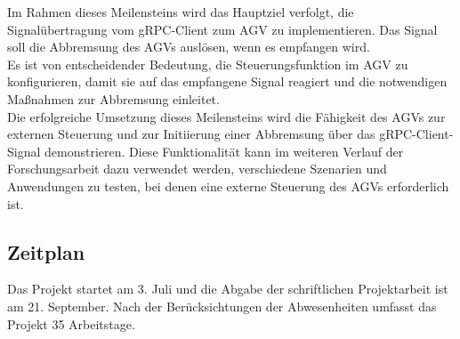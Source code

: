 Im Rahmen dieses Meilensteins wird das Hauptziel verfolgt, die Signalübertragung vom gRPC-Client zum AGV zu implementieren. Das Signal soll die Abbremsung des AGVs auslösen, wenn es empfangen wird.\\
Es ist von entscheidender Bedeutung, die Steuerungsfunktion im AGV zu konfigurieren, damit sie auf das empfangene Signal reagiert und die notwendigen Maßnahmen zur Abbremsung einleitet.\\
Die erfolgreiche Umsetzung dieses Meilensteins wird die Fähigkeit des AGVs zur externen Steuerung und zur Initiierung einer Abbremsung über das gRPC-Client-Signal demonstrieren. Diese Funktionalität kann im weiteren Verlauf der Forschungsarbeit dazu verwendet werden, verschiedene Szenarien und Anwendungen zu testen, bei denen eine externe Steuerung des AGVs erforderlich ist.\\

\subsection{Zeitplan}
Das Projekt startet am 3. Juli und die Abgabe der schriftlichen Projektarbeit ist am 21. September. Nach der Berücksichtungen der Abwesenheiten umfasst das Projekt 35 Arbeitstage.

